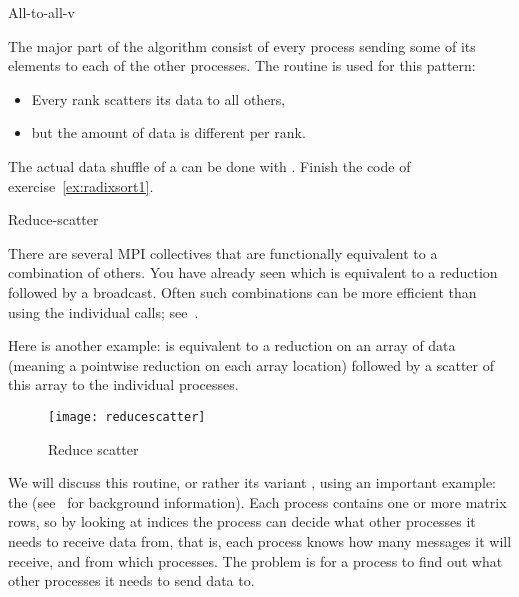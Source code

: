 
 {All-to-all-v}
\label{sec:alltoallv}

The major part of the  algorithm consist
of every process sending some of its elements to
each of the other processes.
The routine  is used for this pattern:
\begin{itemize}
\item Every rank scatters its data to all others,
\item but the amount of data is different per rank.
\end{itemize}

\begin{exercise}
  \label{ex:radixsort2}
  The actual data shuffle of a  can be done
  with . Finish the code of
  exercise~\ref{ex:radixsort1}.
\end{exercise}

 {Reduce-scatter}
\label{sec:reducescatter}

There are several MPI collectives that are functionally equivalent to
a combination of others. You have already seen  which
is equivalent to a reduction followed by a broadcast. Often such
combinations can be more efficient than using the individual calls;
see~.

Here is another example:  is equivalent
to a reduction on an array of data (meaning a pointwise reduction on each
array location) followed by a scatter of this array to the individual 
processes.

\begin{figure}[ht]
  \texttt{[image: reducescatter]}
  \caption{Reduce scatter}
  \label{fig:reducescatter}
\end{figure}

We will discuss this routine,
or rather its variant ,
using an important example: the
(see~ for background information).
Each process contains one or more matrix rows, so by looking at indices
the process can decide what other processes it needs
to receive data from,
that is, each process knows how many messages it will receive,
and from which processes.
The problem is for a process to find out what other processes 
it needs to send data to.

